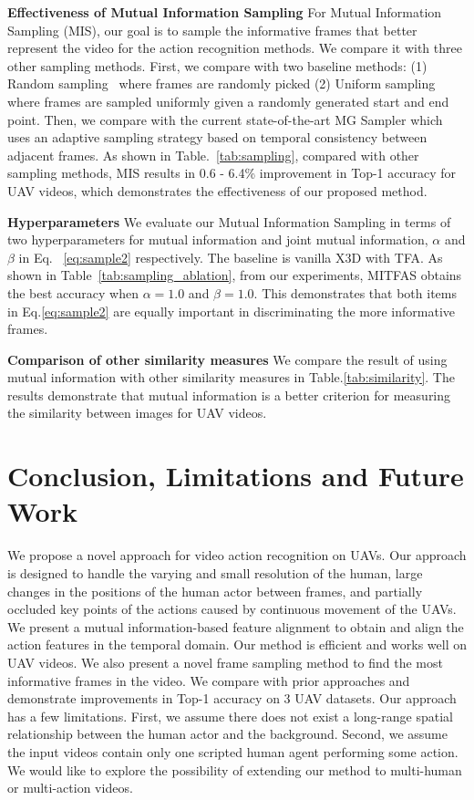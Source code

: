 \documentclass[10pt,twocolumn,letterpaper]{article}
\begin{document}
{\textbf{Effectiveness of Mutual Information Sampling} For Mutual Information Sampling (MIS), our goal is to sample the informative frames that better represent the video for the action recognition methods. We compare it with three other sampling methods. First, we compare with two baseline methods:  (1) Random sampling~\cite{fischler1981random} where frames are randomly picked (2) Uniform sampling~\cite{krizhevsky2017imagenet} where frames are sampled uniformly given a randomly generated start and end point. Then, we compare with the current state-of-the-art MG Sampler \cite{zhi2021mgsampler} which uses an adaptive sampling strategy based on temporal consistency between adjacent frames. As shown in Table.~\ref{tab:sampling}, compared with other sampling methods, MIS results in 0.6 - 6.4\% improvement in Top-1 accuracy for UAV videos, which demonstrates the effectiveness of our proposed method.


\textbf{Hyperparameters}
\label{app: mi_sampling}
We evaluate our Mutual Information Sampling in terms of two hyperparameters for mutual information and joint mutual information, $\alpha$ and $\beta$ in Eq.~ \ref{eq:sample2} respectively. The baseline is vanilla X3D with TFA. As shown in Table~\ref{tab:sampling_ablation}, from our experiments, MITFAS obtains the best accuracy when $\alpha=1.0$ and $\beta=1.0$. This demonstrates that both items in Eq.\ref{eq:sample2} are equally important in discriminating the more informative frames.


\textbf{Comparison of other similarity measures}
We compare the result of using mutual information with other similarity measures in Table.\ref{tab:similarity}. The results demonstrate that mutual information is a better criterion for measuring the similarity between images for UAV videos.

%
 \section{Conclusion, Limitations and Future Work}
We propose a novel approach for video action recognition on UAVs. Our approach is designed to handle the varying and small resolution of the human, large changes in the positions of the human actor between frames, and partially occluded key points of the actions caused by continuous movement of the UAVs.  We present a mutual information-based feature alignment to obtain and align the action features in the temporal domain. Our method is efficient and works well on UAV videos. We also present a novel frame sampling method to find the most informative frames in the video. We compare with prior approaches and demonstrate improvements in Top-1 accuracy on 3 UAV datasets. Our approach has a few limitations. First, we assume there does not exist a long-range spatial relationship between the human actor and the background. Second, we assume the input videos contain only one scripted human agent performing some action. We would like to explore the possibility of extending our method to multi-human or multi-action videos. 


}
\end{document}
